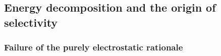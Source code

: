 \subsection{Energy decomposition and the origin of selectivity}
\label{sec:results-eda}
%
%

\subsubsection{Failure of the purely electrostatic rationale}
\label{sec:results-falsification}

